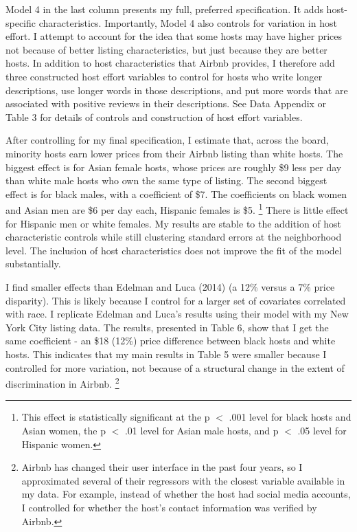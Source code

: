 Model 4 in the last column presents my full, preferred specification. It adds host-specific characteristics. Importantly, Model 4 also controls for variation in host effort. I attempt to account for the idea that some hosts may have higher prices not because of better listing characteristics, but just because they are better hosts. In addition to host characteristics that Airbnb provides, I therefore add three constructed host effort variables to control for hosts who write longer descriptions, use longer words in those descriptions, and put more words that are associated with positive reviews in their descriptions. See Data Appendix or Table 3 for details of controls and construction of host effort variables. 

After controlling for my final specification, I estimate that, across the board, minority hosts earn lower prices from their Airbnb listing than white hosts. The biggest effect is for Asian female hosts, whose prices are roughly \$9 less per day than white male hosts who own the same type of listing. The second biggest effect is for black males, with a coefficient of \$7. The coefficients on black women and Asian men are \$6 per day each, Hispanic females is \$5.%
	\footnote{This effect is statistically significant at the p $<$ .001 level for black hosts and Asian women, the p $<$ .01 level for Asian male hosts, and p $<$ .05 level for Hispanic women.}  
There is little effect for Hispanic men or white females. My results are stable to the addition of host characteristic controls while still clustering standard errors at the neighborhood level. The inclusion of host characteristics does not improve the fit of the model substantially.  

I find smaller effects than Edelman and Luca (2014) (a 12\%  versus a 7\% price disparity). This is likely because I control for a larger set of covariates correlated with race. I replicate Edelman and Luca's results using their model with my New York City listing data. The results, presented in Table 6, show that I get the same coefficient - an \$18 (12\%) price difference between black hosts and white hosts. This indicates that my main results in Table 5 were smaller because I controlled for more variation, not because of a structural change in the extent of discrimination in Airbnb.%
	\footnote{Airbnb has changed their user interface in the past four years, so I approximated several of their regressors with the closest variable available in my data. For example, instead of whether the host had social media accounts, I controlled for whether the host's contact information was verified by Airbnb.}




